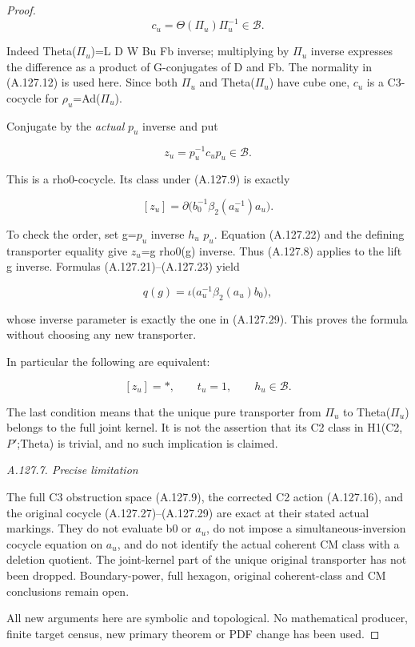 \begin{proof}
\[
 c_u=\Theta(\Pi_u)\Pi_u^{-1}\in\mathcal B.
\tag{A.127.27}
\]

Indeed Theta(\(\Pi_u\))=L D W Bu Fb inverse; multiplying by \(\Pi_u\) inverse expresses the difference as a product of G-conjugates of D and Fb. The normality in (A.127.12) is used here. Since both \(\Pi_u\) and Theta(\(\Pi_u\)) have cube one, \(c_u\) is a C3-cocycle for \(\rho_u\)=Ad(\(\Pi_u\)).

Conjugate by the \emph{actual} \(p_u\) inverse and put

\[
 z_u=p_u^{-1}c_up_u\in\mathcal B.
\tag{A.127.28}
\]

This is a rho0-cocycle. Its class under (A.127.9) is exactly

\[
 \boxed{[z_u]=\partial\bigl(b_0^{-1}\beta_2(a_u^{-1})a_u\bigr).}
\tag{A.127.29}
\]

To check the order, set g=\(p_u\) inverse \(h_u\) \(p_u\). Equation (A.127.22) and the defining transporter equality give \(z_u\)=g rho0(g) inverse. Thus (A.127.8) applies to the lift g inverse. Formulas (A.127.21)--(A.127.23) yield

\[
 q(g)=\iota\bigl(a_u^{-1}\beta_2(a_u)b_0\bigr),
\]

whose inverse parameter is exactly the one in (A.127.29). This proves the formula without choosing any new transporter.

In particular the following are equivalent:

\[
 [z_u]=*,\qquad t_u=1,\qquad h_u\in\mathcal B.
\tag{A.127.30}
\]

The last condition means that the unique pure transporter from \(\Pi_u\) to Theta(\(\Pi_u\)) belongs to the full joint kernel. It is not the assertion that its C2 class in H1(C2,\(P'\);Theta) is trivial, and no such implication is claimed.

\par\smallskip\noindent\emph{A.127.7. Precise limitation}

The full C3 obstruction space (A.127.9), the corrected C2 action (A.127.16), and the original cocycle (A.127.27)--(A.127.29) are exact at their stated actual markings. They do not evaluate b0 or \(a_u\), do not impose a simultaneous-inversion cocycle equation on \(a_u\), and do not identify the actual coherent CM class with a deletion quotient. The joint-kernel part of the unique original transporter has not been dropped. Boundary-power, full hexagon, original coherent-class and CM conclusions remain open.

All new arguments here are symbolic and topological. No mathematical producer, finite target census, new primary theorem or PDF change has been used.


\end{proof}
